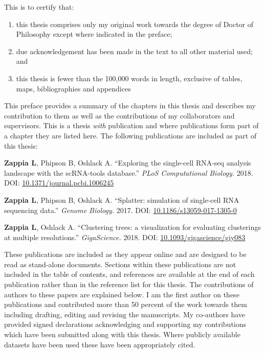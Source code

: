 \documentclass[11pt,a4paper,titlepage,twoside,openright]{style/unimelbthesis}
\theoremstyle{definition}
\theoremstyle{definition}
\theoremstyle{definition}
\theoremstyle{remark}
\begin{document}
\begin{frontmatter}
  \begin{declaration}
    This is to certify that:
    
    \begin{enumerate}
    \def\labelenumi{\roman{enumi}.}
    \item
      this thesis comprises only my original work towards the degree of Doctor of Philosophy except where indicated in the preface;
    \item
      due acknowledgement has been made in the text to all other material used; and
    \item
      this thesis is fewer than the 100,000 words in length, exclusive of tables, maps, bibliographies and appendices
    \end{enumerate}
  \end{declaration}


  \begin{preface}
    This preface provides a summary of the chapters in this thesis and describes my contribution to them as well as the contributions of my collaborators and supervisors. This is a thesis \emph{with} publication and where publications form part of a chapter they are listed here. The following publications are included as part of this thesis:
    
    \textbf{Zappia L}, Phipson B, Oshlack A. ``Exploring the single-cell RNA-seq analysis landscape with the scRNA-tools database.'' \emph{PLoS Computational Biology.} 2018. DOI: \href{https://doi.org/10.1371/journal.pcbi.1006245}{10.1371/journal.pcbi.1006245}
    
    \textbf{Zappia L}, Phipson B, Oshlack A. ``Splatter: simulation of single-cell RNA sequencing data.'' \emph{Genome Biology.} 2017. DOI: \href{https://doi.org/10.1186/s13059-017-1305-0}{10.1186/s13059-017-1305-0}
    
    \textbf{Zappia L}, Oshlack A. ``Clustering trees: a visualization for evaluating clusterings at multiple resolutions.'' \emph{GigaScience.} 2018. DOI: \href{https://doi.org/10.1093/gigascience/giy083}{10.1093/gigascience/giy083}
    
    These publications are included as they appear online and are designed to be read as stand-alone documents. Sections within these publications are not included in the table of contents, and references are available at the end of each publication rather than in the reference list for this thesis. The contributions of authors to these papers are explained below. I am the first author on these publications and contributed more than 50 percent of the work towards them including drafting, editing and revising the manuscripts. My co-authors have provided signed declarations acknowledging and supporting my contributions which have been submitted along with this thesis. Where publicly available datasets have been used these have been appropriately cited.
    

\end{preface}
\end{frontmatter}
\end{document}
